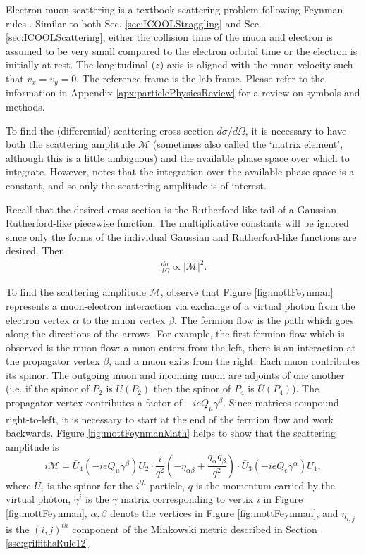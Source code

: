 \label{apx:cosy_cross_section}
 Electron-muon scattering is a textbook scattering problem following Feynman rules \cite{griffithspp}. Similar to both Sec. \ref{sec:ICOOLStraggling} and Sec. \ref{sec:ICOOLScattering}, either the collision time of the muon and electron is assumed to be very small compared to the electron orbital time or the electron is initially at rest. The longitudinal ($z$) axis is aligned with the muon velocity such that $v_x=v_y=0$. The reference frame is the lab frame. Please refer to the information in Appendix \ref{apx:particlePhysicsReview} for a review on symbols and methods.

To find the (differential) scattering cross section $d\sigma/d\Omega$, it is necessary to have both the scattering amplitude $\mathcal{M}$ (sometimes also called the `matrix element', although this is a little ambiguous) and the available phase space over which to integrate. However, \cite{griffithspp} notes that the integration over the available phase space is a constant, and so only the scattering amplitude is of interest.

Recall that the desired cross section is the Rutherford-like tail of a Gaussian--Rutherford-like piecewise function. The multiplicative constants will be ignored since only the forms of the individual Gaussian and Rutherford-like functions are desired. Then
\begin{align*}
\frac{d\sigma}{d\Omega}\propto |\mathcal{M}|^2.
\end{align*}

To find the scattering amplitude $\mathcal{M}$, observe that Figure \ref{fig:mottFeynman} represents a muon-electron interaction via exchange of a virtual photon from the electron vertex $\alpha$ to the muon vertex $\beta$. The fermion flow is the path which goes along the directions of the arrows. For example, the first fermion flow which is observed is the muon flow: a muon enters from the left, there is an interaction at the propagator vertex $\beta$, and a muon exits from the right. Each muon contributes its spinor. The outgoing muon and incoming muon are adjoints of one another (i.e. if the spinor of $P_2$ is $U(P_2)$ then the spinor of $P_4$ is $\bar{U}(P_4)$). The propagator vertex contributes a factor of $-ieQ_\mu\gamma^\beta$. Since matrices compound right-to-left, it is necessary to start at the end of the fermion flow and work backwards. Figure \ref{fig:mottFeynmanMath} helps to show that the scattering amplitude is
\begin{equation} \label{eqn:mottFeynmanScatteringAmplitude}
i\mathcal{M}=\bar{U}_4(-ieQ_\mu\gamma^\beta)U_2\cdot\frac{i}{q^2}(-\eta_{\alpha\beta}+\frac{q_\alpha q_\beta}{q^2})\cdot\bar{U}_3(-ieQ_e\gamma^\alpha)U_1,
\end{equation}
where $U_i$ is the spinor for the $i^{th}$ particle, $q$ is the momentum carried by the virtual photon, $\gamma^i$ is the $\gamma$ matrix corresponding to vertix $i$ in Figure \ref{fig:mottFeynman}, $\alpha,\beta$ denote the vertices in Figure \ref{fig:mottFeynman}, and $\eta_{i,j}$ is the $(i,j)^{th}$ component of the Minkowski metric described in Section \ref{ssc:griffithsRule12}.

